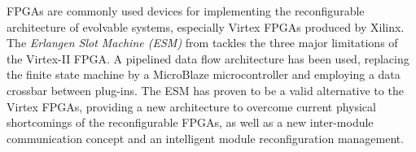 \label{sec:erlangen}
FPGAs are commonly used devices for implementing the reconfigurable architecture of evolvable systems, especially Virtex FPGAs produced by Xilinx. The \emph{Erlangen Slot Machine (ESM)} from \cite{erlangen} tackles the three major limitations of the Virtex-II FPGA. A pipelined data flow architecture has been used, replacing the finite state machine by a MicroBlaze microcontroller and employing a data crossbar between plug-ins. The ESM has proven to be a valid alternative to the Virtex FPGAs, providing a new architecture to overcome current physical shortcomings of the reconfigurable FPGAs, as well as a new inter-module communication concept and an intelligent module reconfiguration management. 
